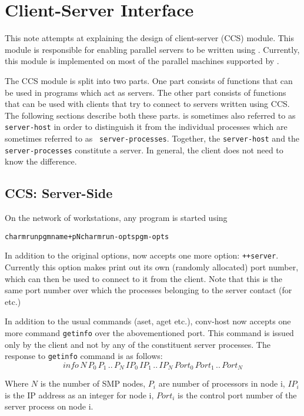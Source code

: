 \chapter{\converse{} Client-Server Interface}

This note attempts at explaining the design of \converse{} client-server (CCS) 
module. This
module is responsible for enabling parallel servers to be written using
\converse{}. Currently, this module is implemented on most of the parallel
machines supported by \converse{}.

The CCS module is split into two parts. One part consists of functions that can
be used in \converse{} programs which act as servers. The other part consists of
functions that can be used with clients that try to connect to servers written
using CCS. The following sections describe both these parts.  is
sometimes also referred to as {\tt server-host} in order to distinguish it from
the individual \converse{} processes which are sometimes referred to as {\tt
server-processes}. Together, the {\tt server-host} and the {\tt
server-processes} constitute a server. In general, the client does not need to
know the difference.


\section{CCS: Server-Side}

On the network of workstations, any \converse{} program is started using
\begin{alltt}
charmrun pgmname +pN charmrun-opts pgm-opts
\end{alltt}
In addition to the original options, now  accepts one more option:
{\tt ++server}.  Currently this option makes  print out its own
(randomly allocated) port number, which can then be used to connect to it from
the client. Note that this is the same port number over which the processes
belonging to the server contact  (for  etc.)

In addition to the usual commands (aset, aget etc.), conv-host now accepts one
more command {\tt getinfo} over the abovementioned port. This command is issued
only by the client and not by any of the constituent server processes. The
response to {\tt getinfo} command is as follows: 
\[info \, N \, P_{0} \, P_{1} \, .. \, P_{N} \, IP_{0} \, IP_{1} \, .. \,
IP_{N} \, Port_{0} \, Port_{1} \, .. \, Port_{N} \]

Where \(N\)  is the number of SMP nodes, \(P_{i}\)  are number of processors in
node i, \(IP_{i}\) is the IP address as an integer for node i, \(Port_{i}\) is
the control port number of the server process on node i.

